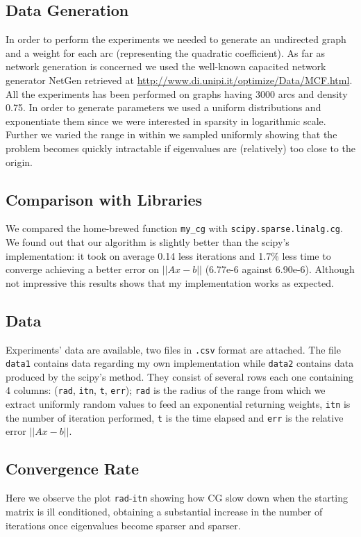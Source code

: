 \documentclass[12pt]{article}
\newcommand{\1}{\mathbbm{1}}
\begin{document}
\subsection{Data Generation}
In order to perform the experiments we needed to generate an undirected graph and a weight for each arc (representing the quadratic coefficient). As far as network generation is concerned we used the well-known capacited network generator NetGen retrieved at \href{http://www.di.unipi.it/optimize/Data/MCF.html}{http://www.di.unipi.it/optimize/Data/MCF.html}. All the experiments has been performed on graphs having 3000 arcs and density 0.75. In order to generate parameters we used a uniform distributions and exponentiate them since we were interested in sparsity in logarithmic scale. Further we varied the range in within we sampled uniformly showing that the problem becomes quickly intractable if eigenvalues are (relatively) too close to the origin.

\subsection{Comparison with Libraries}
We compared the home-brewed function \texttt{my\_cg} with \texttt{scipy.sparse.linalg.cg}. We found out that our algorithm is slightly better than the scipy's implementation: it took on average 0.14 less iterations and 1.7\% less time to converge achieving a better error on $||Ax - b||$ (6.77e-6 against 6.90e-6). Although not impressive this results shows that my implementation works as expected.

\subsection{Data}
Experiments' data are available, two files in \texttt{.csv} format are attached. The file \texttt{data1} contains data regarding my own implementation while \texttt{data2} contains data produced by the scipy's method. They consist of several rows each one containing 4 columns: (\texttt{rad}, \texttt{itn}, \texttt{t}, \texttt{err}); \texttt{rad} is the radius of the range from which we extract uniformly random values to feed an exponential returning weights, \texttt{itn} is the number of iteration performed, \texttt{t} is the time elapsed and \texttt{err} is the relative error $||Ax - b||$.


\subsection{Convergence Rate}
Here we observe the plot \texttt{rad}-\texttt{itn} showing how CG slow down when the starting matrix is ill conditioned, obtaining a substantial increase in the number of iterations once eigenvalues become sparser and sparser. 
\end{document}
